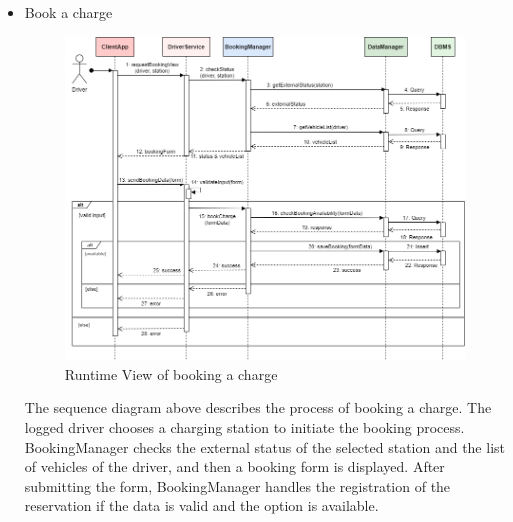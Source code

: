 \documentclass[../main.tex]{subfiles}
\begin{document}
\begin{itemize}
    \newpage
    \item Book a charge
    {
    \vspace{2em}
    \begin{figure}[H]
    \centering
    \includegraphics[width=\textwidth]{runtimeview/rv_bookCharge.png}
    \caption{Runtime View of booking a charge}
    \label{fig:rv_book}
    \end{figure}}
    The sequence diagram above describes the process of booking a charge. The logged driver chooses a charging station to initiate the booking process. BookingManager checks the external status of the selected station and the list of vehicles of the driver, and then a booking form is displayed. After submitting the form, BookingManager handles the registration of the reservation if the data is valid and the option is available.


\end{itemize}
\end{document}
